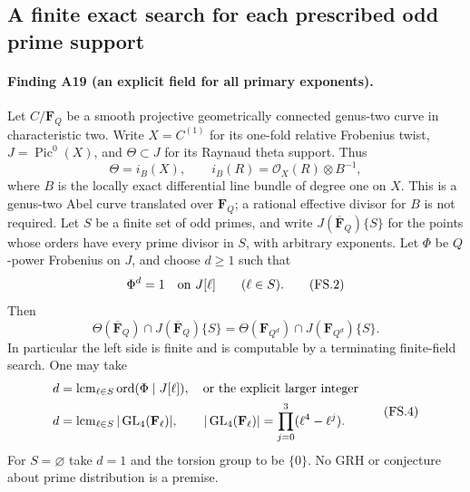 \subsection{A finite exact search for each prescribed odd prime support}
\label{sec:finite-support-theta}

\paragraph{Finding A19 (an explicit field for all primary exponents).}
Let $C/\mathbf F_Q$ be a smooth projective geometrically connected
genus-two curve in characteristic two. Write $X=C^{(1)}$ for its
one-fold relative Frobenius twist, $J=\operatorname{Pic}^0(X)$,
and $\Theta\subset J$ for its Raynaud theta support. Thus
\[
 \Theta=i_B(X),\qquad
 i_B(R)=\mathcal O_X(R)\otimes B^{-1},
                                                               \tag{FS.1}
\]
where $B$ is the locally exact differential line bundle of degree
one on $X$. This is a genus-two Abel curve translated over
$\mathbf F_Q$; a rational effective divisor for $B$ is not required.
Let $S$ be a finite set of odd primes, and write $J(\overline{\mathbf
F}_Q)\{S\}$ for the points whose orders have every prime divisor in
$S$, with arbitrary exponents. Let $\Phi$ be $Q$-power Frobenius on
$J$, and choose $d\ge1$ such that
\[
            \Phi^d=1\quad\hbox{on }J[\ell]
                         \qquad(\ell\in S).                  \tag{FS.2}
\]
Then
\[
 \Theta(\overline{\mathbf F}_Q)\cap J(\overline{\mathbf F}_Q)\{S\}
   =\Theta(\mathbf F_{Q^d})\cap J(\mathbf F_{Q^d})\{S\}.
                                                               \tag{FS.3}
\]
In particular the left side is finite and is computable by a
terminating finite-field search. One may take
\[
 \begin{split}
 d&=\operatorname{lcm}_{\ell\in S}
                  \operatorname{ord}(\Phi\mid J[\ell]),
       \quad\hbox{or the explicit larger integer}\\
 d&=\operatorname{lcm}_{\ell\in S}
                    |\operatorname{GL}_4(\mathbf F_\ell)|,
 \qquad |\operatorname{GL}_4(\mathbf F_\ell)|
                   =\prod_{j=0}^3(\ell^4-\ell^j).
 \end{split}                                                   \tag{FS.4}
\]
For $S=\varnothing$ take $d=1$ and the torsion group to be $\{0\}$.
No GRH or conjecture about prime distribution is a premise.

